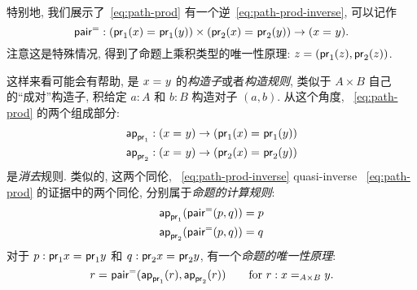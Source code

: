 特别地, 我们展示了~\eqref{eq:path-prod} 有一个逆~\eqref{eq:path-prod-inverse}, 可以记作
\[
\pairpath : (\id{\proj{1}(x)}{\proj{1}(y)}) \times (\id{\proj{2}(x)}{\proj{2}(y)}) \to (\id x y).
\]
注意这是特殊情况, 得到了命题上乘积类型的唯一性原理: $z = (\proj1(z),\proj2(z))$.

这样来看可能会有帮助, \pairpath 是 $\id x y$ 的\emph{构造子}或者\emph{构造规则}, 类似于 $A\times B$ 自己的``成对''构造子, 积给定 $a:A$ 和 $b:B$ 构造对子 $(a,b)$.
从这个角度, ~\eqref{eq:path-prod} 的两个组成部分:
\begin{align*}
  \projpath{1} &: (\id{x}{y}) \to (\id{\proj{1}(x)}{\proj{1} (y)})\\
  \projpath{2} &: (\id{x}{y}) \to (\id{\proj{2}(x)}{\proj{2} (y)})
\end{align*}
是\emph{消去}规则.
类似的, 这两个同伦, ~\eqref{eq:path-prod-inverse} quasi-inverse ~\eqref{eq:path-prod} 的证据中的两个同伦, 分别属于\emph{命题的计算规则}:
%
\begin{align*}
  {\projpath{1}{(\pairpath(p, q)})}
  &= %
  {p} \\
  {\projpath{2}{(\pairpath(p,q)})}
  &= %
  {q}
\end{align*}
对于 $p:\id{\proj{1} x}{\proj{1} y}$ 和 $q:\id{\proj{2} x}{\proj{2} y}$,
有一个\emph{命题的唯一性原理}:
%
\[
\id{r}{\pairpath(\projpath{1} (r), \projpath{2} (r)) }
\qquad\text{for } r : \id[A \times B] x y.
\]

